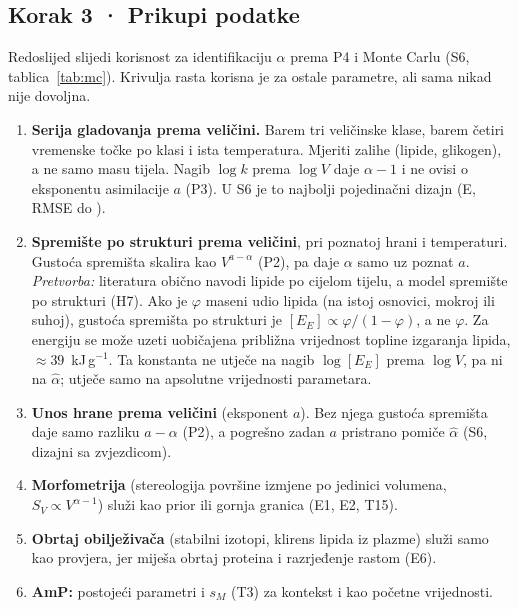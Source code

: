 \subsection*{Korak 3 · Prikupi podatke}
Redoslijed slijedi korisnost za identifikaciju $\alpha$ prema P4 i Monte Carlu (S6, tablica~\ref{tab:mc}). Krivulja rasta korisna je za ostale parametre, ali sama nikad nije dovoljna.
\begin{enumerate}[leftmargin=1.6em]
\item \textbf{Serija gladovanja prema veličini.} Barem tri veličinske klase, barem četiri vremenske točke po klasi i ista temperatura. Mjeriti zalihe (lipide, glikogen), a ne samo masu tijela. Nagib $\log k$ prema $\log V$ daje $\alpha-1$ i ne ovisi o eksponentu asimilacije $a$ (P3). U S6 je to najbolji pojedinačni dizajn (E, RMSE do \MCErmse).
\item \textbf{Spremište po strukturi prema veličini}, pri poznatoj hrani i temperaturi. Gustoća spremišta skalira kao $V^{a-\alpha}$ (P2), pa daje $\alpha$ samo uz poznat $a$. \emph{Pretvorba:} literatura obično navodi lipide po cijelom tijelu, a model spremište po strukturi (H7). Ako je $\varphi$ maseni udio lipida (na istoj osnovici, mokroj ili suhoj), gustoća spremišta po strukturi je $[E_E]\propto\varphi/(1-\varphi)$, a ne $\varphi$. Za energiju se može uzeti uobičajena približna vrijednost topline izgaranja lipida, $\approx39$~kJ\,g$^{-1}$. Ta konstanta ne utječe na nagib $\log[E_E]$ prema $\log V$, pa ni na $\hat\alpha$; utječe samo na apsolutne vrijednosti parametara.
\item \textbf{Unos hrane prema veličini} (eksponent $a$). Bez njega gustoća spremišta daje samo razliku $a-\alpha$ (P2), a pogrešno zadan $a$ pristrano pomiče $\hat\alpha$ (S6, dizajni sa zvjezdicom).
\item \textbf{Morfometrija} (stereologija površine izmjene po jedinici volumena, $S_V\propto V^{\alpha-1}$) služi kao prior ili gornja granica (E1, E2, T15).
\item \textbf{Obrtaj obilježivača} (stabilni izotopi, klirens lipida iz plazme) služi samo kao provjera, jer miješa obrtaj proteina i razrjeđenje rastom (E6).
\item \textbf{AmP:} postojeći parametri i $s_M$ (T3) za kontekst i kao početne vrijednosti.
\end{enumerate}

